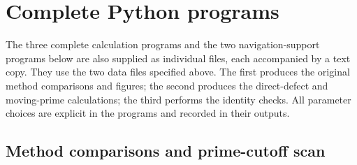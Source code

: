 \documentclass[11pt,reqno]{amsart}
\numberwithin{equation}{section}
\theoremstyle{plain}
\theoremstyle{definition}
\theoremstyle{remark}
\begin{document}
\section{Complete Python programs}
\label{sec:python_code}
The three complete calculation programs and the two navigation-support programs below are also supplied as individual files, each accompanied by a text copy. They use the two data files specified above. The first produces the original method comparisons and figures; the second produces the direct-defect and moving-prime calculations; the third performs the identity checks. All parameter choices are explicit in the programs and recorded in their outputs.

\subsection{Method comparisons and prime-cutoff scan}
\label{subsec:analysis_code}
\end{document}
